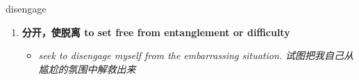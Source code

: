 
\begin{frame}
{\huge disengage}
\begin{center}
\begin{enumerate}\Large
  \item \textbf{分开，使脱离 to set free from entanglement or difficulty}
  \begin{itemize}
    \item \em{\Large{seek to disengage myself from the embarrassing situation. 试图把我自己从尴尬的氛围中解救出来}}
  \end{itemize}
\end{enumerate}
\end{center}
\end{frame}
